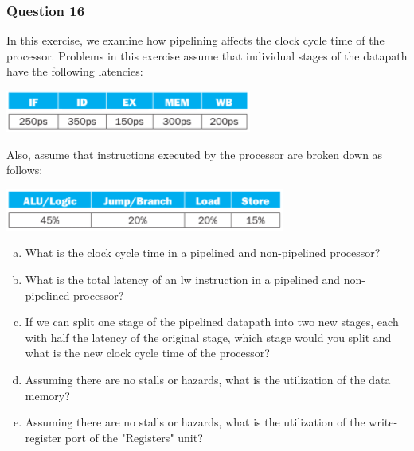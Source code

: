 \documentclass[11pt]{article}
\begin{document}
\setcounter{subsubsection}{15}
\subsubsection{Question 16}
In this exercise, we examine how pipelining affects the clock cycle time of the processor. Problems in this exercise assume that individual stages of the datapath have the following latencies:
\begin{center}\includegraphics[scale=0.68]{q16_image1}\\\end{center}
Also, assume that instructions executed by the processor are broken down as follows:
\begin{center}\includegraphics[scale=0.6]{q16_image2}\\\end{center}

\begin{enumerate}[(a)]
    \item What is the clock cycle time in a pipelined and non-pipelined processor?
    \item What is the total latency of an lw instruction in a pipelined and non-pipelined processor?
    \item If we can split one stage of the pipelined datapath into two new stages, each with half the latency of the original stage, which stage would you split and what is the new clock cycle time of the processor?
    \item Assuming there are no stalls or hazards, what is the utilization of the data memory?
    \item Assuming there are no stalls or hazards, what is the utilization of the write-register port of the "Registers" unit?

\end{enumerate}
\end{document}
